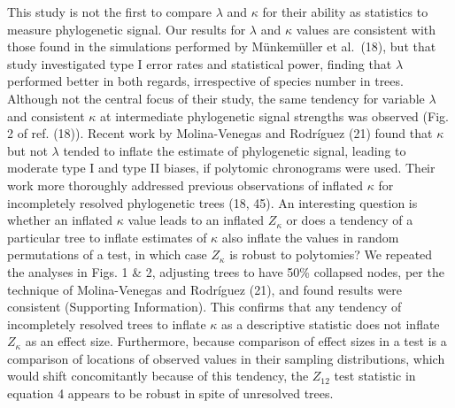 \documentclass[9pt,twocolumn,twoside,lineno]{pnas-new}
\begin{document}
This study is not the first to compare \(\lambda\) and \(\kappa\) for
their ability as statistics to measure phylogenetic signal. Our results
for \(\lambda\) and \(\kappa\) values are consistent with those found in
the simulations performed by Münkemüller et al.~(18), but that study
investigated type I error rates and statistical power, finding that
\(\lambda\) performed better in both regards, irrespective of species
number in trees. Although not the central focus of their study, the same
tendency for variable \(\lambda\) and consistent \(\kappa\) at
intermediate phylogenetic signal strengths was observed (Fig. 2 of ref.
(18)). Recent work by Molina-Venegas and Rodríguez (21) found that
\(\kappa\) but not \(\lambda\) tended to inflate the estimate of
phylogenetic signal, leading to moderate type I and type II biases, if
polytomic chronograms were used. Their work more thoroughly addressed
previous observations of inflated \(\kappa\) for incompletely resolved
phylogenetic trees (18, 45). An interesting question is whether an
inflated \(\kappa\) value leads to an inflated \(Z_\kappa\) or does a
tendency of a particular tree to inflate estimates of \(\kappa\) also
inflate the values in random permutations of a test, in which case
\(Z_\kappa\) is robust to polytomies? We repeated the analyses in Figs.
1 \& 2, adjusting trees to have 50\% collapsed nodes, per the technique
of Molina-Venegas and Rodríguez (21), and found results were consistent
(Supporting Information). This confirms that any tendency of
incompletely resolved trees to inflate \(\kappa\) as a descriptive
statistic does not inflate \(Z_\kappa\) as an effect size. Furthermore,
because comparison of effect sizes in a test is a comparison of
locations of observed values in their sampling distributions, which
would shift concomitantly because of this tendency, the \(Z_{12}\) test
statistic in equation 4 appears to be robust in spite of unresolved
trees.
\end{document}
